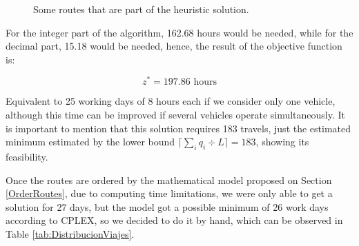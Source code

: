 \documentclass{amsart}
\begin{document}
        \begin{figure}[h!]
            \begin{center}
                \caption{Some routes that are part of the heuristic solution.}
                \label{fig:RutasDeEjemplo}
            \end{center}
        \end{figure}
            
            For the integer part of the algorithm, 162.68 hours would be needed, while for the decimal part, 15.18 would be needed, hence, the result of the objective function is:
            
            $$z^* = 197.86 \text{ hours}$$

            Equivalent to 25 working days of 8 hours each if we consider only one vehicle, although this time can be improved if several vehicles operate simultaneously. It is important to mention that this solution requires 183 travels, just the estimated minimum estimated by the lower bound $\lceil \sum_{i} q_i \div L \rceil = 183$, showing its feasibility.
            
            Once the routes are ordered by the mathematical model proposed on Section \ref{OrderRoutes}, due to computing time limitations, we were only able to get a solution for 27 days, but the model got a possible minimum of 26 work days according to CPLEX, so we decided to do it by hand, which can be observed in Table \ref{tab:DistribucionViajes}.
            
\end{document}

